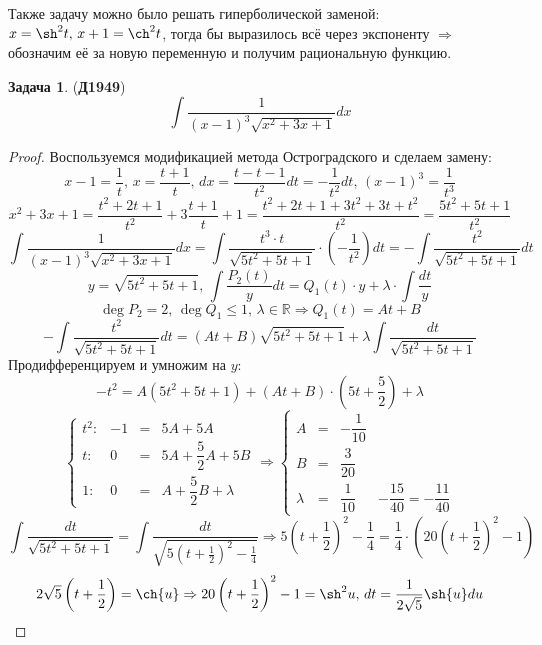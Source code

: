 \documentclass[12pt]{article}
\newcommand{\MR}{\mathbb{R}}
\theoremstyle{definition}
\newtheorem{problem}{Задача}
\DeclareMathOperator{\dint}{\displaystyle\int}
\begin{document}
Также задачу можно было решать гиперболической заменой: $x = \sh^2{t}, \, x + 1 = \ch^2{t}$, тогда бы выразилось всё через экспоненту $\Rightarrow$ обозначим её за новую переменную и получим рациональную функцию.
\newpage
\begin{problem}(\textbf{Д1949})
	$$
		\dint \dfrac{1}{(x-1)^3\sqrt{x^2 + 3x + 1}}dx
	$$
\end{problem}
\begin{proof}
	Воспользуемся модификацией метода Остроградского и сделаем замену:
	$$
		x - 1 = \dfrac{1}{t}, \, x = \dfrac{t + 1}{t}, \, dx = \dfrac{t - t - 1}{t^2}dt = -\dfrac{1}{t^2}dt, \, (x-1)^3 = \dfrac{1}{t^3}
	$$
	$$
		x^2 + 3x + 1 = \dfrac{t^2 + 2t + 1}{t^2} + 3\dfrac{t+1}{t} + 1 = \dfrac{t^2 + 2t + 1 + 3t^2 + 3t + t^2}{t^2} = \dfrac{5t^2 + 5t + 1}{t^2}
	$$
	$$
		\dint \dfrac{1}{(x-1)^3\sqrt{x^2 + 3x + 1}}dx = \dint \dfrac{t^3{\cdot}t}{\sqrt{5t^2 + 5t + 1}}{\cdot}\left(-\dfrac{1}{t^2}\right)dt = -\dint \dfrac{t^2}{\sqrt{5t^2 + 5t + 1}}dt 	
	$$
	$$
		y = \sqrt{5t^2 + 5t + 1}, \, \dint \dfrac{P_2(t)}{y}dt = Q_{1}(t){\cdot}y + \lambda{\cdot}\dint\dfrac{dt}{y} 
	$$
	$$	
		\deg{P_2} = 2,\, \deg{Q_{1}} \leq 1, \, \lambda \in \MR \Rightarrow Q_1(t) = At +B
	$$
	$$
		-\dint \dfrac{t^2}{\sqrt{5t^2 + 5t + 1}}dt 	= (At + B)\sqrt{5t^2 + 5t + 1} + \lambda \dint\dfrac{dt}{\sqrt{5t^2 + 5t + 1}}
	$$
	Продифференцируем и умножим на $y$:
	$$
		-t^2 = A(5t^2 + 5t + 1) + (At + B){\cdot}\left(5t + \dfrac{5}{2}\right) + \lambda
	$$
	$$
		\left\{
			\begin{matrix}
				t^2 \colon & -1 &=& 5A + 5A \\[10pt]
				t \colon & 0 & = & 5A + \dfrac{5}{2}A + 5B \\[10pt]
				1 \colon & 0 & = & A+ \dfrac{5}{2}B + \lambda
			\end{matrix}
		\right. \Rightarrow
		\left\{
			\begin{matrix}
				A &=& -\dfrac{1}{10}&\\[10pt]
				B& = & \dfrac{3}{20} &\\[10pt]
				\lambda & = & \dfrac{1}{10} & - \dfrac{15}{40} = -\dfrac{11}{40}
			\end{matrix}
		\right.
	$$
	$$
		\dint\dfrac{dt}{\sqrt{5t^2 + 5t + 1}} = \dint \dfrac{dt}{\sqrt{5\left(t + \tfrac{1}{2}\right)^2 - \tfrac{1}{4}}} \Rightarrow 5\left(t + \dfrac{1}{2}\right)^2 - \dfrac{1}{4}= \dfrac{1}{4}{\cdot}\left(20\left(t + \dfrac{1}{2}\right)^2 - 1\right)
	$$
	$$
		2\sqrt{5}\left(t + \dfrac{1}{2}\right) = \ch{u} \Rightarrow 20\left(t + \dfrac{1}{2}\right)^2 - 1 = \sh^2{u}, \, dt  = \dfrac{1}{2\sqrt{5}}\sh{u}du
$$
\end{proof}
\end{document}
